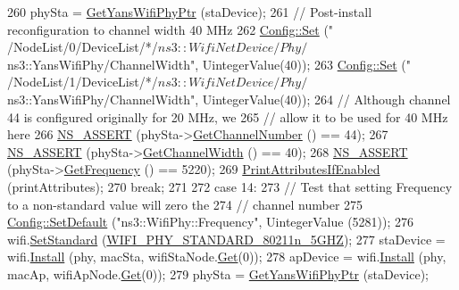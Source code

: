 \begin{DoxyCode}
260       phySta = \hyperlink{wifi-phy-configuration_8cc_a50ec12cbf31121934173cb4a44215e73}{GetYansWifiPhyPtr} (staDevice);
261       \textcolor{comment}{// Post-install reconfiguration to channel width 40 MHz}
262       \hyperlink{group__config_gadce03667ec621d64ce4aace85d9bcfd0}{Config::Set} (\textcolor{stringliteral}{"
      /NodeList/0/DeviceList/*/$ns3::WifiNetDevice/Phy/$ns3::YansWifiPhy/ChannelWidth"}, UintegerValue(40));
263       \hyperlink{group__config_gadce03667ec621d64ce4aace85d9bcfd0}{Config::Set} (\textcolor{stringliteral}{"
      /NodeList/1/DeviceList/*/$ns3::WifiNetDevice/Phy/$ns3::YansWifiPhy/ChannelWidth"}, UintegerValue(40));
264       \textcolor{comment}{// Although channel 44 is configured originally for 20 MHz, we }
265       \textcolor{comment}{// allow it to be used for 40 MHz here}
266       \hyperlink{assert_8h_a6dccdb0de9b252f60088ce281c49d052}{NS\_ASSERT} (phySta->\hyperlink{classns3_1_1WifiPhy_a5cf0ccf06109ace61db51c83e91b7e8d}{GetChannelNumber} () == 44);
267       \hyperlink{assert_8h_a6dccdb0de9b252f60088ce281c49d052}{NS\_ASSERT} (phySta->\hyperlink{classns3_1_1WifiPhy_a4a5d5009b3b3308f2baeed42a2007189}{GetChannelWidth} () == 40);
268       \hyperlink{assert_8h_a6dccdb0de9b252f60088ce281c49d052}{NS\_ASSERT} (phySta->\hyperlink{classns3_1_1WifiPhy_ad2508d94faf22d690d6b8b4367934fd1}{GetFrequency} () == 5220);
269       \hyperlink{wifi-phy-configuration_8cc_a73f0822e1f64b23097cbff2fc565842f}{PrintAttributesIfEnabled} (printAttributes);
270       \textcolor{keywordflow}{break};
271 
272     \textcolor{keywordflow}{case} 14:
273       \textcolor{comment}{// Test that setting Frequency to a non-standard value will zero the}
274       \textcolor{comment}{// channel number}
275       \hyperlink{group__config_ga2e7882df849d8ba4aaad31c934c40c06}{Config::SetDefault} (\textcolor{stringliteral}{"ns3::WifiPhy::Frequency"}, UintegerValue (5281));
276       wifi.\hyperlink{classns3_1_1WifiHelper_aa54f3e61527ef8de318d310045bc5dfd}{SetStandard} (\hyperlink{group__wifi_gga1299834f4e1c615af3ca738033b76a49aaabe94a0be4668583c42595437b4a6c0}{WIFI\_PHY\_STANDARD\_80211n\_5GHZ});
277       staDevice = wifi.\hyperlink{classns3_1_1WifiHelper_a451b3d33fa1497c22f06c5451f57a127}{Install} (phy, macSta, wifiStaNode.\hyperlink{classns3_1_1NodeContainer_a9ed96e2ecc22e0f5a3d4842eb9bf90bf}{Get}(0));
278       apDevice = wifi.\hyperlink{classns3_1_1WifiHelper_a451b3d33fa1497c22f06c5451f57a127}{Install} (phy, macAp, wifiApNode.\hyperlink{classns3_1_1NodeContainer_a9ed96e2ecc22e0f5a3d4842eb9bf90bf}{Get}(0));
279       phySta = \hyperlink{wifi-phy-configuration_8cc_a50ec12cbf31121934173cb4a44215e73}{GetYansWifiPhyPtr} (staDevice);

\end{DoxyCode}
